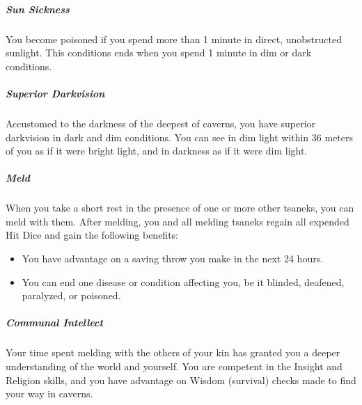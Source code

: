 \subparagraph{Sun Sickness} You become poisoned if you spend more than 1 minute in direct, unobstructed sunlight.
This conditions ends when you spend 1 minute in dim or dark conditions.

\subparagraph{Superior Darkvision} Accustomed to the darkness of the deepest of caverns, you have superior darkvision in dark and dim conditions.
You can see in dim light within 36 meters of you as if it were bright light, and in darkness as if it were dim light.

\subparagraph{Meld} When you take a short rest in the presence of one or more other tsaneks, you can meld with them.
After melding, you and all melding tsaneks regain all expended Hit Dice and gain the following benefits:
\begin{itemize}
    \item You have advantage on a saving throw you make in the next 24 hours.
    \item You can end one disease or condition affecting you, be it blinded, deafened, paralyzed, or poisoned.
\end{itemize}

\subparagraph{Communal Intellect} Your time spent melding with the others of your kin has granted you a deeper understanding of the world and yourself.
You are competent in the Insight and Religion skills, and you have advantage on Wisdom (survival) checks made to find your way in caverns.



\newpage
